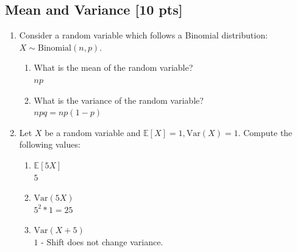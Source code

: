 \documentclass[a4paper]{article}
\theoremstyle{definition}
\newcommand{\Var}{\mathrm{Var}}
\newenvironment{soln}{
	\leavevmode\color{blue}\ignorespaces
}{}
\begin{document}
	\subsection{Mean and Variance [10 pts]}
	\begin{enumerate}
		\item Consider a random variable which follows a Binomial
		distribution: $X \sim \text{Binomial}(n, p)$.
		\begin{enumerate}
			\item What is the mean of the random variable?\\
			\begin{soln}  $np$ \end{soln}
			\item What is the variance of the random variable?\\
			\begin{soln} $npq=np(1-p)$ \end{soln}
		\end{enumerate}
		
		\item Let $X$ be a random variable and
		$\mathbb{E}[X] = 1, \Var(X) = 1$. Compute the following values:
		\begin{enumerate}
			\item $\mathbb{E}[5X]$\\
			\begin{soln}  $5$ \end{soln}
			\item $\Var(5X)$\\
			\begin{soln} $5^{2}*1=25$  \end{soln}
			\item $\Var(X+5)$\\
			\begin{soln}  $1$ - Shift does not change variance.
			\end{soln}
		\end{enumerate}
	\end{enumerate}
	
	
\end{document}
